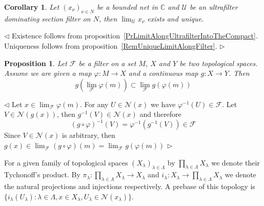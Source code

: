 \documentclass[12pt]{article}
\newtheorem{proposition}[theorem]{Proposition}
\newtheorem{corollary}[theorem]{Corollary}
\newenvironment{proof}{\par $\triangleleft$}{$\triangleright$}
\begin{document}
\begin{corollary}\label{PrLimitOfASequenceAlongUltrafilter} Let
    ${(x_\nu)}_{\nu\in N}$ be a bounded net in $\mathbb{C}$ and
    $\mathcal{U}$ be an ultrafilter dominating section filter on
    $N$, then $\lim_{\mathcal{U}}x_\nu$ exists and unique.
\end{corollary}
\begin{proof} Existence follows from
    proposition~\ref{PrLimitAlongUltrafilterIntoTheCompact}. Uniqueness follows
    from proposition~\ref{RemUniqueLimitAlongFilter}.
\end{proof}


\begin{proposition}\label{PrFiltersUnderContinuousFunctions} Let $\mathcal{F}$
    be a filter on a set $M$, $X$ and $Y$ be two topological spaces. Assume we
    are given a map $\varphi:M\to X$ and a continuous map $g: X\to Y$. Then
    $$
        g\left(\lim_{\mathcal{F}}\varphi(m)\right)\subset\lim_{\mathcal{F}}g(\varphi(m))
    $$
\end{proposition}
\begin{proof} Let $x\in\lim_{\mathcal{F}}\varphi(m)$. For any
    $U\in\mathcal{N}(x)$ we have $\varphi^{-1}(U)\in\mathcal{F}$. Let
    $V\in\mathcal{N}(g(x))$, then $g^{-1}(V)\in\mathcal{N}(x)$ and therefore
    $$
        {(g\circ\varphi)}^{-1}(V)=\varphi^{-1}(g^{-1}(V))\in\mathcal{F}
    $$
    Since $V\in\mathcal{N}(x)$ is arbitrary, then
    $g(x)\in\lim_{\mathcal{F}}(g\circ\varphi)(m)=\lim_{\mathcal{F}}g(\varphi(m))$
\end{proof}

For a given family of topological spaces ${(X_\lambda)}_{\lambda\in \Lambda}$ by
$\prod_{\lambda\in \Lambda}X_\lambda$ we denote their Tychonoff's product. By
$\pi_\lambda:\prod_{\lambda\in \Lambda}X_\lambda\to X_\lambda$ and
$i_\lambda:X_\lambda\to \prod_{\lambda\in \Lambda}X_\lambda$ we denote the
natural projections and injections respectively. A prebase of this topology is
$\{i_{\lambda}(U_\lambda):\lambda\in\Lambda, x\in X_\lambda, U_\lambda\in
    \mathcal{N}(x_\lambda)\}$.
\end{document}
